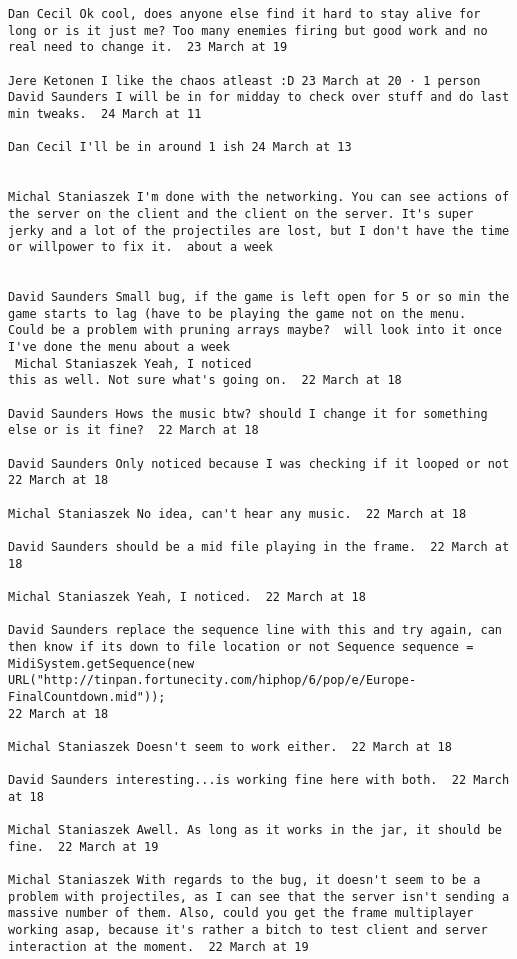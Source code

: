 \begin{verbatim}
Dan Cecil Ok cool, does anyone else find it hard to stay alive for
long or is it just me? Too many enemies firing but good work and no
real need to change it.  23 March at 19

Jere Ketonen I like the chaos atleast :D 23 March at 20 · 1 person
David Saunders I will be in for midday to check over stuff and do last
min tweaks.  24 March at 11

Dan Cecil I'll be in around 1 ish 24 March at 13


Michal Staniaszek I'm done with the networking. You can see actions of
the server on the client and the client on the server. It's super
jerky and a lot of the projectiles are lost, but I don't have the time
or willpower to fix it.  about a week 


David Saunders Small bug, if the game is left open for 5 or so min the
game starts to lag (have to be playing the game not on the menu.
Could be a problem with pruning arrays maybe?  will look into it once
I've done the menu about a week 
 Michal Staniaszek Yeah, I noticed
this as well. Not sure what's going on.  22 March at 18

David Saunders Hows the music btw? should I change it for something
else or is it fine?  22 March at 18

David Saunders Only noticed because I was checking if it looped or not
22 March at 18

Michal Staniaszek No idea, can't hear any music.  22 March at 18

David Saunders should be a mid file playing in the frame.  22 March at
18

Michal Staniaszek Yeah, I noticed.  22 March at 18

David Saunders replace the sequence line with this and try again, can
then know if its down to file location or not Sequence sequence =
MidiSystem.getSequence(new
URL("http://tinpan.fortunecity.com/hiphop/6/pop/e/Europe-FinalCountdown.mid"));
22 March at 18

Michal Staniaszek Doesn't seem to work either.  22 March at 18

David Saunders interesting...is working fine here with both.  22 March
at 18

Michal Staniaszek Awell. As long as it works in the jar, it should be
fine.  22 March at 19

Michal Staniaszek With regards to the bug, it doesn't seem to be a
problem with projectiles, as I can see that the server isn't sending a
massive number of them. Also, could you get the frame multiplayer
working asap, because it's rather a bitch to test client and server
interaction at the moment.  22 March at 19


\end{verbatim}
